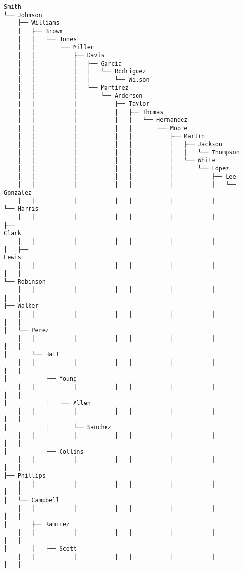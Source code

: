 \documentclass[11pt]{article}
\begin{document}
    \begin{Verbatim}[commandchars=\\\{\}]
Smith
└── Johnson
    ├── Williams
    │   ├── Brown
    │   │   └── Jones
    │   │       └── Miller
    │   │           ├── Davis
    │   │           │   ├── Garcia
    │   │           │   │   └── Rodriguez
    │   │           │   │       └── Wilson
    │   │           │   └── Martinez
    │   │           │       └── Anderson
    │   │           │           ├── Taylor
    │   │           │           │   ├── Thomas
    │   │           │           │   │   └── Hernandez
    │   │           │           │   │       └── Moore
    │   │           │           │   │           ├── Martin
    │   │           │           │   │           │   ├── Jackson
    │   │           │           │   │           │   │   └── Thompson
    │   │           │           │   │           │   └── White
    │   │           │           │   │           │       └── Lopez
    │   │           │           │   │           │           ├── Lee
    │   │           │           │   │           │           │   └── Gonzalez
    │   │           │           │   │           │           │       └── Harris
    │   │           │           │   │           │           │           ├──
Clark
    │   │           │           │   │           │           │           │   ├──
Lewis
    │   │           │           │   │           │           │           │   │
└── Robinson
    │   │           │           │   │           │           │           │   │
├── Walker
    │   │           │           │   │           │           │           │   │
│   └── Perez
    │   │           │           │   │           │           │           │   │
│       └── Hall
    │   │           │           │   │           │           │           │   │
│           ├── Young
    │   │           │           │   │           │           │           │   │
│           │   └── Allen
    │   │           │           │   │           │           │           │   │
│           │       └── Sanchez
    │   │           │           │   │           │           │           │   │
│           └── Collins
    │   │           │           │   │           │           │           │   │
├── Phillips
    │   │           │           │   │           │           │           │   │
│   └── Campbell
    │   │           │           │   │           │           │           │   │
│       ├── Ramirez
    │   │           │           │   │           │           │           │   │
│       │   ├── Scott
    │   │           │           │   │           │           │           │   │

\end{Verbatim}
\end{document}
